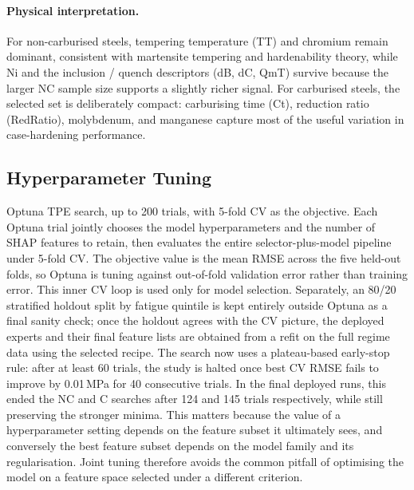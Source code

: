 \documentclass[12pt,a4paper]{article} %
\begin{document}
\paragraph{Physical interpretation.} For non-carburised steels, tempering temperature
(TT) and chromium remain dominant, consistent with martensite tempering and
hardenability theory, while Ni and the inclusion / quench descriptors (dB, dC, QmT)
survive because the larger NC sample size supports a slightly richer signal. For
carburised steels, the selected set is deliberately compact: carburising time (Ct),
reduction ratio (RedRatio), molybdenum, and manganese capture most of the useful
variation in case-hardening performance.

\subsection{Hyperparameter Tuning}
Optuna TPE search, up to 200 trials, with 5-fold CV as the objective.
Each Optuna trial jointly chooses the model hyperparameters and the number of SHAP
features to retain, then evaluates the entire selector-plus-model pipeline under 5-fold CV.
The objective value is the mean RMSE across the five held-out folds, so Optuna is tuning
against out-of-fold validation error rather than training error. This inner CV loop is used
only for model selection. Separately, an 80/20 stratified holdout split by fatigue quintile
is kept entirely outside Optuna as a final sanity check; once the holdout agrees with the
CV picture, the deployed experts and their final feature lists are obtained from a refit on
the full regime data using the selected recipe.
The search now uses a plateau-based early-stop rule: after at least 60 trials, the study is
halted once best CV RMSE fails to improve by 0.01\,MPa for 40 consecutive trials. In the
final deployed runs, this ended the NC and C searches after 124 and 145 trials
respectively, while still preserving the stronger minima.
This matters because the value of a hyperparameter setting depends on the feature subset it
ultimately sees, and conversely the best feature subset depends on the model family and its
regularisation. Joint tuning therefore avoids the common pitfall of optimising the model on
a feature space selected under a different criterion.
\end{document}

